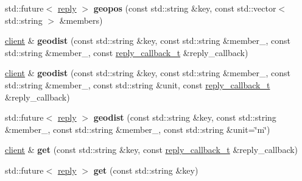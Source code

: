 \begin{DoxyCompactItemize}
\mbox{\label{classcpp__redis_1_1client_a8166870c7f3b6c5152eb85a233d78368}} 
std\+::future$<$ \hyperlink{classcpp__redis_1_1reply}{reply} $>$ {\bfseries geopos} (const std\+::string \&key, const std\+::vector$<$ std\+::string $>$ \&members)
\item 
\mbox{\label{classcpp__redis_1_1client_a56df27bbe73c7738854150359ba39958}} 
\hyperlink{classcpp__redis_1_1client}{client} \& {\bfseries geodist} (const std\+::string \&key, const std\+::string \&member\+\_, const std\+::string \&member\+\_, const \hyperlink{classcpp__redis_1_1client_a061a1140d36d2eaeda82b09a0bb3f9f2}{reply\+\_\+callback\+\_\+t} \&reply\+\_\+callback)
\item 
\mbox{\label{classcpp__redis_1_1client_ade755123f2de81995df6a66a363a0dfb}} 
\hyperlink{classcpp__redis_1_1client}{client} \& {\bfseries geodist} (const std\+::string \&key, const std\+::string \&member\+\_, const std\+::string \&member\+\_, const std\+::string \&unit, const \hyperlink{classcpp__redis_1_1client_a061a1140d36d2eaeda82b09a0bb3f9f2}{reply\+\_\+callback\+\_\+t} \&reply\+\_\+callback)
\item 
\mbox{\label{classcpp__redis_1_1client_a32c21dc5c2b8187c33e22e695c2f1555}} 
std\+::future$<$ \hyperlink{classcpp__redis_1_1reply}{reply} $>$ {\bfseries geodist} (const std\+::string \&key, const std\+::string \&member\+\_, const std\+::string \&member\+\_, const std\+::string \&unit=\char`\"{}m\char`\"{})
\item 
\mbox{\label{classcpp__redis_1_1client_a1521d8c4c751d970c446aae7ccf8cc35}} 
\hyperlink{classcpp__redis_1_1client}{client} \& {\bfseries get} (const std\+::string \&key, const \hyperlink{classcpp__redis_1_1client_a061a1140d36d2eaeda82b09a0bb3f9f2}{reply\+\_\+callback\+\_\+t} \&reply\+\_\+callback)
\item 
\mbox{\label{classcpp__redis_1_1client_af2f987e43e139b21df2138a541b766f8}} 
std\+::future$<$ \hyperlink{classcpp__redis_1_1reply}{reply} $>$ {\bfseries get} (const std\+::string \&key)
\item 
\mbox{\label{classcpp__redis_1_1client_ad57b10f052814a2a15d4687e34d2be72}} 

\end{DoxyCompactItemize}
